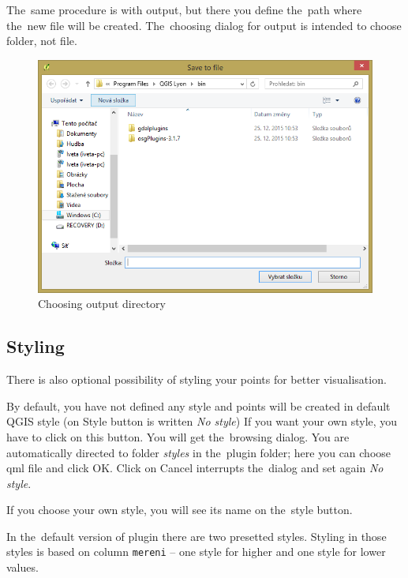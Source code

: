 The~same procedure is with output, but there you define
the~path where the~new file will be created.
The~choosing dialog for output is intended to
choose folder, not file. 

 \begin{figure}[H]
   \centering
	\includegraphics[scale=0.75]{./pictures/output.png}
	\caption[Choosing output directory]{Choosing output directory}
     \label{fig:output}
  \end{figure}

\subsection{Styling}
\label{styling}

There is also optional possibility of styling your points for better visualisation. 

By default, you have not defined any style
and points will be created in default QGIS style
(on Style button is written \textit{No style})
If you want your own style, you have to click on
this button. You will get the~browsing dialog.
You are automatically directed to folder
\textit{styles} in the~plugin folder; here you can
choose qml file and click OK. Click on Cancel
interrupts the~dialog and set again \textit{No style}. 

If you choose your own style, you will see its name on the~style button. 

In the~default version of plugin there are two presetted styles. Styling in those styles is based on
column {\tt mereni} – one style for higher and one style for lower values. 

